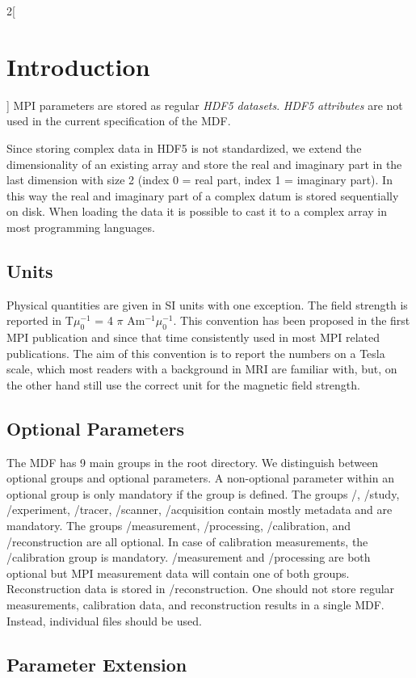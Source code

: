 \documentclass[landscape,a4paper]{article} %
\newcommand{\inlvar}[1]{{\ttfamily#1}}
\begin{document}
\begin{multicols}{2}[\section{Introduction} \label{Sec:Introduction}]
MPI parameters are stored as regular \textit{HDF5 datasets}. \textit{HDF5 attributes} are not used in the current specification of the MDF.

Since storing complex data in HDF5 is not standardized, we extend the dimensionality of an existing array and store the real and imaginary part in the last dimension with size 2 (index 0 = real part, index 1 = imaginary part). In this way the real and imaginary part of a complex datum is stored sequentially on disk. When loading the data it is possible to cast it to a complex array in most programming languages.

\subsection{Units}

Physical quantities are given in SI units with one exception. The field strength is reported in T$\mu_0^{-1}$ = 4 $\pi$ Am$^{-1}\mu_0^{-1}$. This convention has been proposed in the first MPI publication and since that time consistently used in most MPI related publications. The aim of this convention is to report the numbers on a Tesla scale, which most readers with a background in MRI are familiar with, but, on the other hand still use the correct unit for the magnetic field strength.

\subsection{Optional Parameters}

The MDF has 9 main groups in the root directory. We distinguish between optional groups and optional parameters. A non-optional parameter within an optional group is only mandatory if the group is defined.  The groups \inlvar{/}, \inlvar{/study}, \inlvar{/experiment}, \inlvar{/tracer}, \inlvar{/scanner}, \inlvar{/acquisition} contain mostly metadata and are mandatory. The groups \inlvar{/measurement}, \inlvar{/processing}, \inlvar{/calibration}, and \inlvar{/reconstruction} are all optional. In case of calibration measurements, the \inlvar{/calibration} group is mandatory. \inlvar{/measurement} and \inlvar{/processing} are both optional but MPI measurement data will contain one of both groups. Reconstruction data is stored in \inlvar{/reconstruction}. One should not store regular measurements, calibration data, and reconstruction results in a single MDF. Instead, individual files should be used.

\subsection{Parameter Extension}


\end{multicols}
\end{document}
